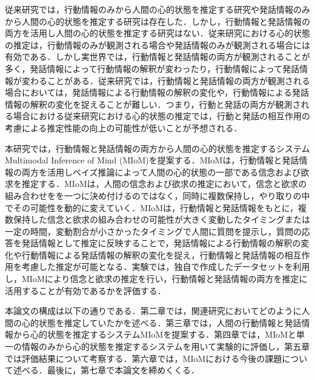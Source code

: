 \par
従来研究では，行動情報のみから人間の心的状態を推定する研究や発話情報のみから人間の心的状態を推定する研究は存在した．しかし，行動情報と発話情報の両方を活用し人間の心的状態を推定する研究はない．従来研究における心的状態の推定は，行動情報のみが観測される場合や発話情報のみが観測される場合には有効である．しかし実世界では，行動情報と発話情報の両方が観測されることが多く，発話情報によって行動情報の解釈が変わったり，行動情報によって発話情報が変わることがある．従来研究では，行動情報と発話情報の両方が観測される場合においては，発話情報による行動情報の解釈の変化や，行動情報による発話情報の解釈の変化を捉えることが難しい．つまり，行動と発話の両方が観測される場合における従来研究における心的状態の推定では，行動と発話の相互作用の考慮による推定性能の向上の可能性が低いことが予想される．

\par
本研究では，行動情報と発話情報の両方から人間の心的状態を推定するシステムMultimodal Inference of Mind (MIoM)を提案する．MIoMは，行動情報と発話情報の両方を活用しベイズ推論によって人間の心的状態の一部である信念および欲求を推定する．MIoMは，人間の信念および欲求の推定において，信念と欲求の組み合わせをを一つに決め付けるのではなく，同時に複数保持し，やり取りの中でその可能性を動的に変えていく．MIoMは，行動情報と発話情報をもとに，複数保持した信念と欲求の組み合わせの可能性が大きく変動したタイミングまたは一定の時間，変動割合が小さかったタイミングで人間に質問を提示し，質問の応答を発話情報として推定に反映することで，発話情報による行動情報の解釈の変化や行動情報による発話情報の解釈の変化を捉え，行動情報と発話情報の相互作用を考慮した推定が可能となる．実験では，独自で作成したデータセットを利用し，MIoMにより信念と欲求の推定を行い，行動情報と発話情報の両方を推定に活用することが有効であるかを評価する．

\par
本論文の構成は以下の通りである．第二章では，関連研究においてどのように人間の心的状態を推定していたかを述べる．第三章では，人間の行動情報と発話情報から心的状態を推定するシステムMIoMを提案する．第四章では，MIoMと単一の情報のみから心的状態を推定するシステムを用いて実験的に評価し，第五章では評価結果について考察する．第六章では，MIoMにおける今後の課題について述べる．最後に，第七章で本論文を締めくくる．
